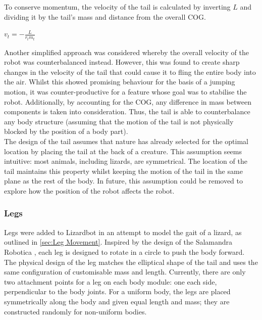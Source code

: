 \documentclass{article}
\begin{document}
\noindent To conserve momentum, the velocity of the tail is calculated by inverting $L$ and dividing it by the tail's mass and distance from the overall COG.
\begin{center}
\begin{Large}
$v_{t} = - \frac{L}{r_{t}m_{t}}$\\
\end{Large}
\end{center}

Another simplified approach was considered whereby the overall velocity of the robot was counterbalanced instead. However, this was found to create sharp changes in the velocity of the tail that could cause it to fling the entire body into the air. Whilst this showed promising behaviour for the basis of a jumping motion, it was counter-productive for a feature whose goal was to stabilise the robot. Additionally, by accounting for the COG, any difference in mass between components is taken into consideration. Thus, the tail is able to counterbalance any body structure (assuming that the motion of the tail is not physically blocked by the position of a body part).\\

The design of the tail assumes that nature has already selected for the optimal location by placing the tail at the back of a creature. This assumption seems intuitive: most animals, including lizards, are symmetrical. The location of the tail maintains this property whilst keeping the motion of the tail in the same plane as the rest of the body. In future, this assumption could be removed to explore how the position of the robot affects the robot.

\subsubsection{Legs}
\label{sec:Legs Imp}
Legs were added to Lizardbot in an attempt to model the gait of a lizard, as outlined in \ref{sec:Leg Movement}. Inspired by the design of the Salamandra Robotica , each leg is designed to rotate in a circle to push the body forward. The physical design of the leg matches the elliptical shape of the tail and uses the same configuration of customisable mass and length. 
Currently, there are only two attachment points for a leg on each body module: one each side, perpendicular to the body joints. For a uniform body, the legs are placed symmetrically along the body and given equal length and mass; they are constructed randomly for non-uniform bodies. \\
\end{document}
